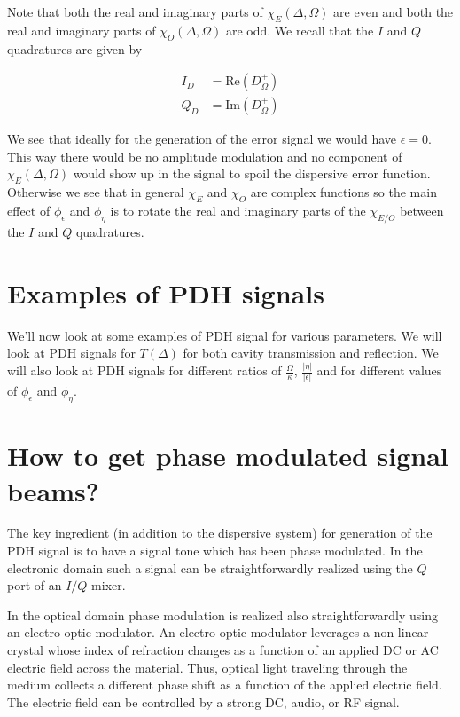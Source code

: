 \documentclass[12pt]{article}
\newcommand{\ep}{\epsilon}
\begin{document}
Note that both the real and imaginary parts of $\chi_E(\Delta, \Omega)$ are even and both the real and imaginary parts of $\chi_O(\Delta, \Omega)$ are odd. We recall that the $I$ and $Q$ quadratures are given by

\begin{align}
I_D &= \text{Re}(D_{\Omega}^+)\\
Q_D &= \text{Im}(D_{\Omega}^+)
\end{align}

We see that ideally for the generation of the error signal we would have $\ep = 0$. This way there would be no amplitude modulation and no component of $\chi_E(\Delta, \Omega)$ would show up in the signal to spoil the dispersive error function. Otherwise we see that in general $\chi_E$ and $\chi_O$ are complex functions so the main effect of $\phi_{\ep}$ and $\phi_{\eta}$ is to rotate the real and imaginary parts of the $\chi_{E/O}$ between the $I$ and $Q$ quadratures.

\section{Examples of PDH signals}

We'll now look at some examples of PDH signal for various parameters. We will look at PDH signals for $T(\Delta)$ for both cavity transmission and reflection. We will also look at PDH signals for different ratios of $\frac{\Omega}{\kappa}$, $\frac{|\eta|}{|\ep|}$ and for different values of $\phi_{\ep}$ and $\phi_{\eta}$.

\section{How to get phase modulated signal beams?}

The key ingredient (in addition to the dispersive system) for generation of the PDH signal is to have a signal tone which has been phase modulated. In the electronic domain such a signal can be straightforwardly realized using the $Q$ port of an $I/Q$ mixer.

In the optical domain phase modulation is realized also straightforwardly using an electro optic modulator. An electro-optic modulator leverages a non-linear crystal whose index of refraction changes as a function of an applied DC or AC electric field across the material. Thus, optical light traveling through the medium collects a different phase shift as a function of the applied electric field. The electric field can be controlled by a strong DC, audio, or RF signal.
\end{document}
